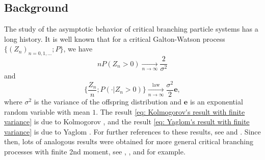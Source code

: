 \documentclass[12pt, a4paper]{amsart}
\theoremstyle{definition}
\numberwithin{equation}{section}
\begin{document}
\subsection{Background}
    The study of the asymptotic behavior of critical branching particle systems has a long history.
	It is well known that for a critical Galton-Watson 
    process $\{(Z_n)_{n = 0,1,\dots}; P\}$,	
	we have
	\[\label{eq: Kolmogorov's result with finite variance}
		n P(Z_n > 0)
		\xrightarrow[n\to \infty]{} \frac{2}{\sigma^2}
	\]
	and
	\[\label{eq: Yaglom's result with finite variance}
		\Big\{ \frac{Z_n}{n}; P(\cdot| Z_n > 0) \Big\}
		\xrightarrow[n \to \infty]{\operatorname{law}} \frac{\sigma^2}{2} \mathbf e,
	\]
	where $\sigma^2$ is the variance of the offspring distribution and $\mathbf e$ is an exponential random variable with mean $1$.
	The result \eqref{eq: Kolmogorov's result with finite variance} is due to Kolmogorov \cite{Kolmogorov1938Zur-losung}, and the result \eqref{eq: Yaglom's result with finite variance} is due to Yaglom \cite{Yaglom1947Certain}.
	For further references to these results, see \cite{Harris2002The-theory} and \cite{KestenNeySpitzer1966The-Galton-Watson}.
	Since then, lots of analogous results were obtained for more general critical branching processes with finite 2nd moment, see \cite{AsmussenHering1983Branching}, \cite{AthreyaNey1974Functionals}, \cite{AthreyaNey1972Branching} and \cite{JoffeSpitzer1967On-multitype} for example.
	
\end{document}
